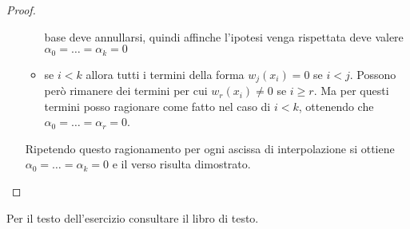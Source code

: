 \begin{proof}
\begin{enumerate}
\begin{itemize}
    base deve annullarsi, quindi affinche l'ipotesi venga rispettata deve valere 
    $\alpha_{0} = \ldots = \alpha_{k} = 0$
    \item se $i < k$ allora tutti i termini della forma $w_{j}(x_{i}) = 0$ se
    $i < j$. Possono per\`o rimanere dei termini per cui  $w_{r}(x_{i}) \not =
    0$ se $i \geq r$. Ma per questi termini posso ragionare come fatto nel caso
    di $i < k$, ottenendo che $\alpha_{0} = \ldots = \alpha_{r} = 0$.
  \end{itemize}
   Ripetendo questo ragionamento per ogni ascissa di interpolazione si ottiene
  $\alpha_{0} = \ldots = \alpha_{k} = 0$ e il verso risulta dimostrato.
 \end{enumerate}
\end{proof}

\begin{exercise}[4.5] 
Per il testo dell'esercizio consultare il libro di testo.
\end{exercise}
